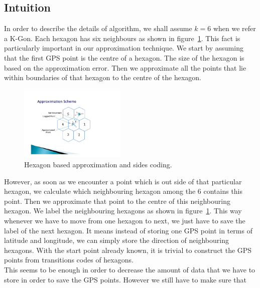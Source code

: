 \documentclass[conference]{IEEEtran}
\begin{document}
\subsection{Intuition}
\label{subs:Intution}
In order to describe the details of algorithm, we shall assume $k = 6$ when we refer a K-Gon. Each hexagon 
has six neighbours as shown in figure~\ref{fig:multiple-hexagons}. This fact is particularly important in 
our approximation technique. We start by assuming that the first GPS point is the centre of  a hexagon. The 
size of the hexagon is based on the approximation error. Then we approximate all the points that lie within 
boundaries of that hexagon to the centre of the hexagon. 
\begin{figure}[ht]
\centering
  \includegraphics[width=2in]{images/hexagon-figure.pdf}
  \caption {Hexagon based approximation and sides coding.}\label{fig:multiple-hexagons}
\end{figure}
However, as soon as we encounter a point which is out side of that particular hexagon, we calculate which 
neighbouring hexagon among the 6 contains this point. Then we approximate that point to the centre of this 
neighbouring hexagon. We label the neighbouring hexagons as shown in figure~\ref{fig:multiple-hexagons}. 
This way whenever we have to move from one hexagon to next, we just have to save the label of the next 
hexagon. It means instead of storing one GPS point in terms of latitude and longitude, we can simply store 
the direction of neighbouring hexagons. With the start point already known, it is trivial to construct the 
GPS points from transitions codes of hexagons.\\
This seems to be enough in order to decrease the amount of data that we have to store in order to save the 
GPS points. However we still have to make sure that 
\end{document}
